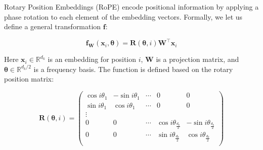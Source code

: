 \documentclass{article}
\begin{document}
Rotary Position Embeddings (RoPE) \citep{su2024roformer} encode positional information by applying a phase rotation to each element of the embedding vectors. Formally, we let us define a general transformation $\mathbf{f}$:


\begin{equation}
\mathbf{f}_\mathbf{W}(\mathbf{x}_i, \bm{\theta}) = \mathbf{R}(\bm{\theta}, i)\mathbf{W}^\top \mathbf{x}_i
\end{equation}

Here $\mathbf{x}_i \in \mathbb{R}^{d_k}$ is an embedding for position $i$, $\mathbf{W}$ is a projection matrix, and $\bm{\theta} \in \mathbb{R}^{d_k / 2}$ is a frequency basis. The function is defined based on the rotary position matrix: 

\begin{equation}
\mathbf{R}(\bm{\theta},i)= \begin{pmatrix}
\cos i\theta_1 & - \sin i\theta_1 &  \cdots & 0 & 0 \\
\sin i\theta_1 & \cos i\theta_1 & \cdots & 0 & 0 \\
\vdots \\ 
0 & 0 &  \cdots & \cos i\theta_\frac{d_k}{2}  & - \sin i\theta_\frac{d_k}{2}  \\
0 & 0 &  \cdots & \sin i\theta_\frac{d_k}{2}  & \cos i\theta_\frac{d_k}{2}  \\
\end{pmatrix}
\end{equation}





 

\end{document}
